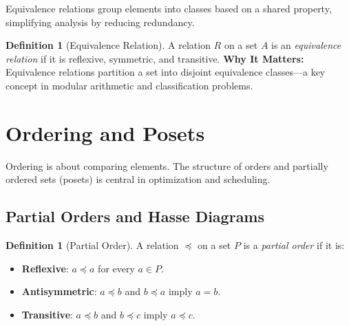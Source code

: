 \documentclass[12pt]{article}
\theoremstyle{definition}
\newtheorem{definition}[theorem]{Definition}
\begin{document}
Equivalence relations group elements into classes based on a shared property, simplifying analysis by reducing redundancy.

\begin{definition}[Equivalence Relation]
  A relation \(R\) on a set \(A\) is an \emph{equivalence relation} if it is reflexive, symmetric, and transitive.
  \vspace{0.5em}
  \textbf{Why It Matters:} Equivalence relations partition a set into disjoint equivalence classes—a key concept in modular arithmetic and classification problems.
\end{definition}

\begin{center}
\end{center}

\section{Ordering and Posets}

Ordering is about comparing elements. The structure of orders and partially ordered sets (posets) is central in optimization and scheduling.

\subsection{Partial Orders and Hasse Diagrams}

\begin{definition}[Partial Order]
  A relation \(\preceq\) on a set \(P\) is a \emph{partial order} if it is:
  \begin{itemize}[itemsep=3pt]
    \item \textbf{Reflexive}: \(a \preceq a\) for every \(a \in P\).
    \item \textbf{Antisymmetric}: \(a \preceq b\) and \(b \preceq a\) imply \(a = b\).
    \item \textbf{Transitive}: \(a \preceq b\) and \(b \preceq c\) imply \(a \preceq c\).
  \end{itemize}
\end{definition}
\end{document}
